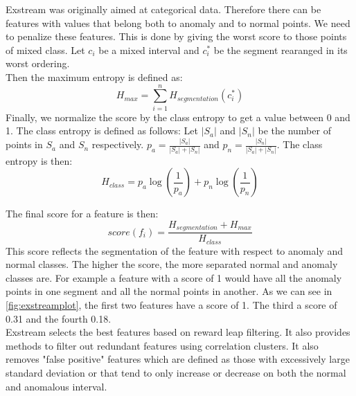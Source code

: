 \documentclass[oneside, a4paper, onecolumn, 11pt]{article}
\begin{document}
Exstream was originally aimed at categorical data. Therefore there can be features with values that belong both to anomaly and to normal points. We need to penalize these features. This is done by giving the worst score to those points of mixed class. Let $c_i$ be a mixed interval and $c_i^*$ be the segment rearanged in its worst ordering.\\
Then the maximum entropy is defined as:
\begin{equation}
    H_{max} = \sum_{i=1}^{n} H_{segmentation}(c_i^*)
\end{equation}
Finally, we normalize the score by the class entropy to get a value between 0 and 1. The class entropy is defined as follows:
Let $|S_a|$ and $|S_n|$ be the number of points in $S_a$ and $S_n$ respectively. $p_a = \frac{|S_a|}{|S_a| + |S_n|}$ and $p_n = \frac{|S_n|}{|S_a| + |S_n|}$. The class entropy is then:
\begin{equation}
    H_{class} = p_a \log(\frac{1}{p_a}) + p_n \log(\frac{1}{p_n})
\end{equation}

The final score for a feature is then:
\begin{equation}
    score(f_i) = \frac{H_{segmentation} + H_{max}}{H_{class}}
\end{equation}
This score reflects the segmentation of the feature with respect to anomaly and normal classes. The higher the score, the more separated normal and anomaly classes are. For example a feature with a score of 1 would have all the anomaly points in one segment and all the normal points in another. As we can see in \autoref{fig:exstreamplot}, the first two features have a score of 1. The third a score of 0.31 and the fourth 0.18.\\
Exstream selects the best features based on reward leap filtering. It also provides methods to filter out redundant features using correlation clusters. It also removes "false positive" features which are defined as those with excessively large standard deviation or that tend to only increase or decrease on both the normal and anomalous interval.\\
\end{document}

